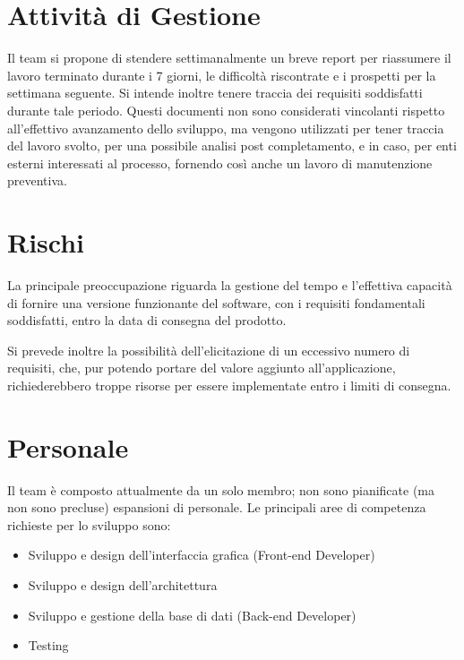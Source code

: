\documentclass{article}
\begin{document}
\section{Attività di Gestione}
\label{sec:5}
Il team si propone di stendere settimanalmente un breve report per riassumere il lavoro terminato durante i 7 giorni, le difficoltà riscontrate e i prospetti per la settimana seguente. Si intende inoltre tenere traccia dei requisiti soddisfatti durante tale periodo. Questi documenti non sono considerati vincolanti rispetto all'effettivo avanzamento dello sviluppo, ma vengono utilizzati per tener traccia del lavoro svolto, per una possibile analisi post completamento, e in caso, per enti esterni interessati al processo, fornendo così anche un lavoro di manutenzione preventiva.
\section{Rischi}
La principale preoccupazione riguarda la gestione del tempo e l'effettiva capacità di fornire una versione funzionante del software, con i requisiti fondamentali soddisfatti, entro la data di consegna del prodotto. \newline 

Si prevede inoltre la possibilità dell'elicitazione di un eccessivo numero di requisiti, che, pur potendo portare del valore aggiunto all'applicazione, richiederebbero troppe risorse per essere implementate entro i limiti di consegna.  
\section{Personale}
Il team è composto attualmente da un solo membro; non sono pianificate (ma non sono precluse) espansioni di personale. Le principali aree di competenza richieste per lo sviluppo sono:
\begin{itemize}
    \item Sviluppo e design dell'interfaccia grafica (Front-end Developer)
    \item Sviluppo e design dell'architettura  
    \item Sviluppo e gestione della base di dati (Back-end Developer) 
    \item Testing 
\end{itemize}
\end{document}
